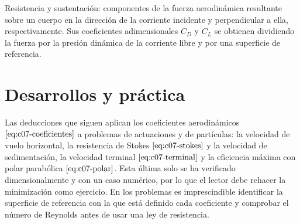 \documentclass[10pt,openany]{book}
\begin{document}
\begin{tcolorbox}[title={Definición}, studiumdef, breakable]

Resistencia y sustentación: componentes de la fuerza aerodinámica resultante sobre un cuerpo en la dirección de la corriente incidente y perpendicular a ella, respectivamente. Sus coeficientes adimensionales \(C_D\) y \(C_L\) se obtienen dividiendo la fuerza por la presión dinámica de la corriente libre y por una superficie de referencia.
\end{tcolorbox}



\section{Desarrollos y práctica}

Las deducciones que siguen aplican los coeficientes aerodinámicos \(\eqref{eq:c07-coeficientes}\) a problemas de actuaciones y de partículas: la velocidad de vuelo horizontal, la resistencia de Stokes \(\eqref{eq:c07-stokes}\) y la velocidad de sedimentación, la velocidad terminal \(\eqref{eq:c07-terminal}\) y la eficiencia máxima con polar parabólica \(\eqref{eq:c07-polar}\). Esta última solo se ha verificado dimensionalmente y con un caso numérico, por lo que el lector debe rehacer la minimización como ejercicio. En los problemas es imprescindible identificar la superficie de referencia con la que está definido cada coeficiente y comprobar el número de Reynolds antes de usar una ley de resistencia.
\end{document}
